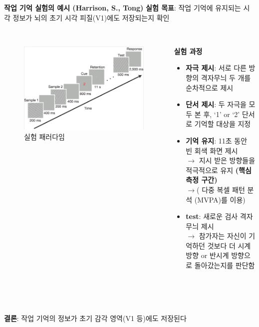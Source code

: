 \documentclass{beamer}
\begin{document}
\begin{frame}{\textbf{작업 기억 실험의 예시 (Harrison, S., Tong)}}
  \textbf{실험 목표}: 작업 기억에 유지되는 시각 정보가 뇌의 초기 시각 피질(V1)에도 저장되는지 확인\\~\\

  \begin{columns}
    \begin{column}{0.38\textwidth}
      \centering
      \begin{figure}
        \centering
        \includegraphics[width=\textwidth]{image/Harrison}
        \caption{실험 패러다임}
      \end{figure}
    \end{column}
    \hfill
    \begin{column}{0.62\textwidth}
      \textbf{실험 과정}
      \vspace{-0.5em}
      \begin{itemize}
        \setlength{\itemsep}{0em}
        \setlength{\parskip}{0em}
        \item \textbf{자극 제시}: 서로 다른 방향의 격자무늬 두 개를 순차적으로 제시
        \item \textbf{단서 제시}: 두 자극을 모두 본 후, `1' or `2' 단서로 기억할 대상을 지정
        \item \textbf{기억 유지}: 11초 동안 빈 회색 화면 제시\\
          $\rightarrow$ 지시 받은 방향들을 적극적으로 유지 \textbf{(핵심 측정 구간)}\\
          $\rightarrow$( 다중 복셀 패턴 분석 (MVPA)를 이용)
        \item \textbf{test}: 새로운 검사 격자무늬 제시\\
          $\rightarrow$ 참가자는 자신이 기억하던 것보다 더 시계 방향 or 반시계 방향으로 돌아갔는지를 판단함
      \end{itemize}
    \end{column}
  \end{columns}\\~\\~\\

  \textbf{결론}: 작업 기억의 정보가 초기 감각 영역(V1 등)에도 저장된다
\end{frame}
\end{document}
